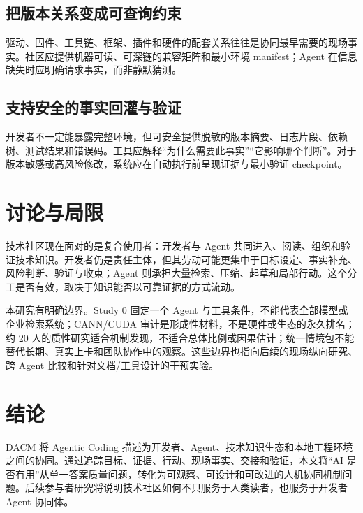 \documentclass[manuscript,review,anonymous]{acmart}
\begin{document}
\subsection{把版本关系变成可查询约束}
驱动、固件、工具链、框架、插件和硬件的配套关系往往是协同最早需要的现场事实。社区应提供机器可读、可深链的兼容矩阵和最小环境 manifest；Agent 在信息缺失时应明确请求事实，而非静默猜测。

\subsection{支持安全的事实回灌与验证}
开发者不一定能暴露完整环境，但可安全提供脱敏的版本摘要、日志片段、依赖树、测试结果和错误码。工具应解释“为什么需要此事实”“它影响哪个判断”。对于版本敏感或高风险修改，系统应在自动执行前呈现证据与最小验证 checkpoint。

\section{讨论与局限}

技术社区现在面对的是复合使用者：开发者与 Agent 共同进入、阅读、组织和验证技术知识。开发者仍是责任主体，但其劳动可能更集中于目标设定、事实补充、风险判断、验证与收束；Agent 则承担大量检索、压缩、起草和局部行动。这个分工是否有效，取决于知识能否以可靠证据的方式流动。

本研究有明确边界。Study 0 固定一个 Agent 与工具条件，不能代表全部模型或企业检索系统；CANN/CUDA 审计是形成性材料，不是硬件或生态的永久排名；约 20 人的质性研究适合机制发现，不适合总体比例或因果估计；统一情境包不能替代长期、真实上卡和团队协作中的观察。这些边界也指向后续的现场纵向研究、跨 Agent 比较和针对文档/工具设计的干预实验。

\section{结论}

DACM 将 Agentic Coding 描述为开发者、Agent、技术知识生态和本地工程环境之间的协同。通过追踪目标、证据、行动、现场事实、交接和验证，本文将“AI 是否有用”从单一答案质量问题，转化为可观察、可设计和可改进的人机协同机制问题。后续参与者研究将说明技术社区如何不只服务于人类读者，也服务于开发者--Agent 协同体。



\end{document}
